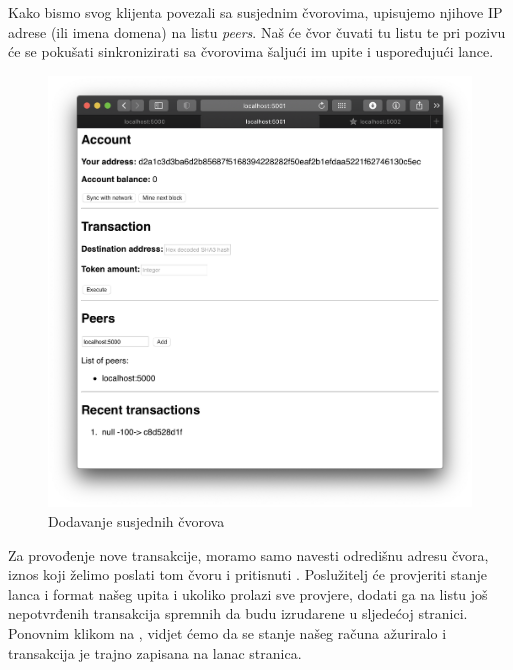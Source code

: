 \documentclass[utf8, zavrsni]{fer}
\begin{document}
Kako bismo svog klijenta povezali sa susjednim čvorovima, upisujemo njihove IP adrese (ili imena domena) na listu \textit{peers}. Naš će čvor čuvati tu listu te pri pozivu  će se pokušati sinkronizirati sa čvorovima šaljući im upite i uspoređujući lance.

\begin{figure}[H]
    \centering
    \includegraphics[width=\textwidth]{dodavanje_ip_adrese_susjeda.png}
    \caption{Dodavanje susjednih čvorova}
    \label{fig:dodaj_ip}
\end{figure}

Za provođenje nove transakcije, moramo samo navesti odredišnu adresu čvora, iznos koji želimo poslati tom čvoru i pritisnuti . Poslužitelj će provjeriti stanje lanca i format našeg upita i ukoliko prolazi sve provjere, dodati ga na listu još nepotvrđenih transakcija spremnih da budu izrudarene u sljedećoj stranici. Ponovnim klikom na , vidjet ćemo da se stanje našeg računa ažuriralo i transakcija je trajno zapisana na lanac stranica.
\end{document}
